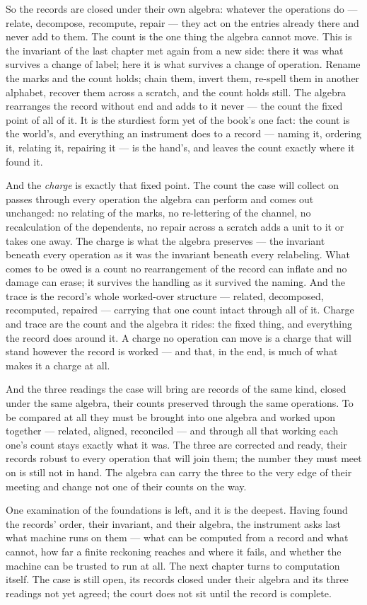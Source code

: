 So the records are closed under their own algebra: whatever the operations do --- relate, decompose, recompute,
repair --- they act on the entries already there and never add to them. The count is the one thing the algebra
cannot move. This is the invariant of the last chapter met again from a new side: there it was what survives a
change of label; here it is what survives a change of operation. Rename the marks and the count holds; chain
them, invert them, re-spell them in another alphabet, recover them across a scratch, and the count holds still.
The algebra rearranges the record without end and adds to it never --- the count the fixed point of all of it.
It is the sturdiest form yet of the book's one fact: the count is the world's, and everything an instrument does
to a record --- naming it, ordering it, relating it, repairing it --- is the hand's, and leaves the count
exactly where it found it.

And the \emph{charge} is exactly that fixed point. The count the case will collect on passes through every
operation the algebra can perform and comes out unchanged: no relating of the marks, no re-lettering of the
channel, no recalculation of the dependents, no repair across a scratch adds a unit to it or takes one away. The
charge is what the algebra preserves --- the invariant beneath every operation as it was the invariant beneath
every relabeling. What comes to be owed is a count no rearrangement of the record can inflate and no damage can
erase; it survives the handling as it survived the naming. And the trace is the record's whole worked-over
structure --- related, decomposed, recomputed, repaired --- carrying that one count intact through all of it.
Charge and trace are the count and the algebra it rides: the fixed thing, and everything the record does around
it. A charge no operation can move is a charge that will stand however the record is worked --- and that, in the
end, is much of what makes it a charge at all.

And the three readings the case will bring are records of the same kind, closed under the same algebra, their
counts preserved through the same operations. To be compared at all they must be brought into one algebra and
worked upon together --- related, aligned, reconciled --- and through all that working each one's count stays
exactly what it was. The three are corrected and ready, their records robust to every operation that will join
them; the number they must meet on is still not in hand. The algebra can carry the three to the very edge of
their meeting and change not one of their counts on the way.

One examination of the foundations is left, and it is the deepest. Having found the records' order, their
invariant, and their algebra, the instrument asks last what machine runs on them --- what can be computed from a
record and what cannot, how far a finite reckoning reaches and where it fails, and whether the machine can be
trusted to run at all. The next chapter turns to computation itself. The case is still open, its records closed
under their algebra and its three readings not yet agreed; the court does not sit until the record is complete.
